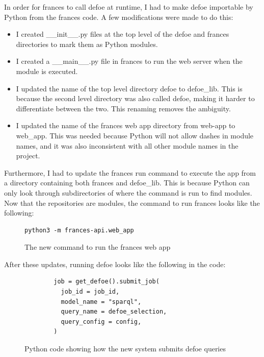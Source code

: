 \documentclass[12pt, letterpaper]{article}
\begin{document}
\begin{flushleft}
In order for frances to call defoe at runtime, I had to make defoe importable by Python from the frances code. A few modifications were made to do this:
\end{flushleft}

\begin{itemize}
\item I created \_\_init\_\_.py files at the top level of the defoe and frances directories to mark them as Python modules.
\item I created a \_\_main\_\_.py file in frances to run the web server when the module is executed.
\item I updated the name of the top level directory defoe to defoe\_lib. This is because the second level directory was also called defoe, making it harder to differentiate between the two. This renaming removes the ambiguity.
\item I updated the name of the frances web app directory from web-app to web\_app. This was needed because Python will not allow dashes in module names, and it was also inconsistent with all other module names in the project.
\end{itemize}

\begin{flushleft}
Furthermore, I had to update the frances run command to execute the app from a directory containing both frances and defoe\_lib. This is because Python can only look through subdirectories of where the command is run to find modules. Now that the repositories are modules, the command to run frances looks like the following:
\end{flushleft}

\begin{flushleft}
\begin{figure}[H]
\begin{verbatim}
python3 -m frances-api.web_app
\end{verbatim}
\caption{The new command to run the frances web app}
\end{figure}
\end{flushleft}

\begin{flushleft}
After these updates, running defoe looks like the following in the code:
\end{flushleft}

\begin{flushleft}
\begin{figure}[H]
\begin{verbatim}
        job = get_defoe().submit_job(
          job_id = job_id,
          model_name = "sparql",
          query_name = defoe_selection,
          query_config = config,
        )
\end{verbatim}
\caption{Python code showing how the new system submits defoe queries}
\end{figure}
\end{flushleft}
\end{document}
